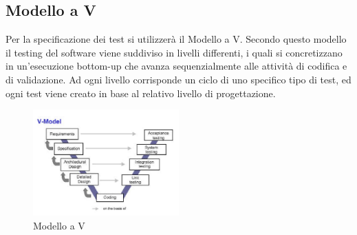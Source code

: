 	\subsection{Modello a V}
	\label{modelloAV}
			Per la specificazione dei test si utilizzerà il Modello a V. Secondo questo modello il testing del software viene suddiviso in livelli differenti, i quali si concretizzano in un'esecuzione bottom-up che avanza sequenzialmente alle attività di codifica e di validazione. Ad ogni livello corrisponde un ciclo di uno specifico tipo di test, ed ogni test viene creato in base al relativo livello di progettazione.
			\begin{figure}[htp]
				\centering
				\includegraphics[width=0.5\textwidth]{img/V-model.jpg}
				\caption{Modello a V}
			\end{figure}
